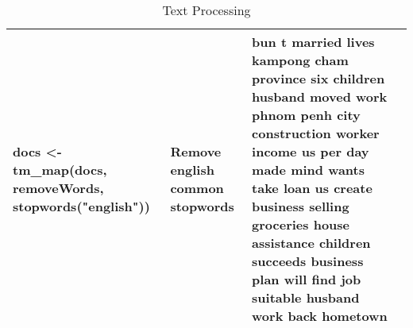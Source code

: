 \begin{table}[!htb]
\begin{tabular}{llll}
  docs <- tm_map(docs, removeWords, stopwords("english")) & Remove english common stopwords & bun t   married  lives  kampong cham province   six children  husband moved  work  phnom penh city   construction worker   income  us per day   made   mind   wants  take  loan  us  create  business  selling groceries   house   assistance   children   succeeds   business plan  will find  job suitable   husband  work back   hometown \\ 
   \hline
\end{tabular}
\caption{Text Processing} 
\label{tab:Text_Processing}
\end{table}
